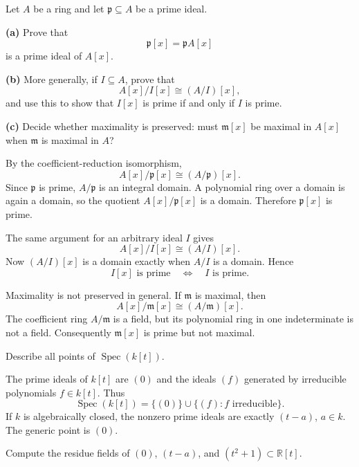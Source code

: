 \begin{problem}[CP-V-0011]
\label{prob:cp-v-0011}
Let \(A\) be a ring and let \(\mathfrak p\subseteq A\) be a prime ideal.

\textbf{(a)} Prove that
\[
\mathfrak p[x]=\mathfrak p A[x]
\]
is a prime ideal of \(A[x]\).

\textbf{(b)} More generally, if \(I\subseteq A\), prove that
\[
A[x]/I[x]\cong(A/I)[x],
\]
and use this to show that \(I[x]\) is prime if and only if \(I\) is prime.

\textbf{(c)} Decide whether maximality is preserved: must
\(\mathfrak m[x]\) be maximal in \(A[x]\) when \(\mathfrak m\) is maximal
in \(A\)?
\end{problem}

\begin{solution}
By the coefficient-reduction isomorphism,
\[
A[x]/\mathfrak p[x]\cong(A/\mathfrak p)[x].
\]
Since \(\mathfrak p\) is prime, \(A/\mathfrak p\) is an integral domain.
A polynomial ring over a domain is again a domain, so the quotient
\(A[x]/\mathfrak p[x]\) is a domain. Therefore \(\mathfrak p[x]\) is prime.

The same argument for an arbitrary ideal \(I\) gives
\[
A[x]/I[x]\cong(A/I)[x].
\]
Now \((A/I)[x]\) is a domain exactly when \(A/I\) is a domain. Hence
\[
I[x]\text{ is prime}\quad\Longleftrightarrow\quad I\text{ is prime}.
\]

Maximality is not preserved in general. If \(\mathfrak m\) is maximal, then
\[
A[x]/\mathfrak m[x]\cong(A/\mathfrak m)[x].
\]
The coefficient ring \(A/\mathfrak m\) is a field, but its polynomial ring
in one indeterminate is not a field. Consequently \(\mathfrak m[x]\) is
prime but not maximal.
\end{solution}


\begin{problem}[CP-V-0090]
\label{prob:cp-v-0090}
Describe all points of \(\operatorname{Spec}(k[t])\).
\end{problem}

\begin{solution}
The prime ideals of \(k[t]\) are \((0)\) and the ideals \((f)\) generated by irreducible polynomials \(f\in k[t]\). Thus
\[
\operatorname{Spec}(k[t])=\{(0)\}\cup\{(f):f\text{ irreducible}\}.
\]
If \(k\) is algebraically closed, the nonzero prime ideals are exactly \((t-a)\), \(a\in k\). The generic point is \((0)\).
\end{solution}


\begin{problem}[CP-V-0091]
\label{prob:cp-v-0091}
Compute the residue fields of \((0)\), \((t-a)\), and \((t^2+1)\subset \mathbb R[t]\).
\end{problem}

